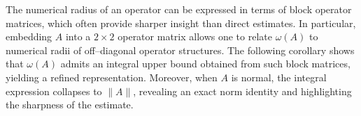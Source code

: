 \documentclass[12pt,twoside,reqno]{amsart}
\numberwithin{equation}{section}
\begin{document}
The numerical radius of an operator can be expressed in terms of block operator matrices, which often provide sharper insight than direct estimates. In particular, embedding $A$ into a $2\times2$ operator matrix allows one to relate $\omega(A)$ to numerical radii of off–diagonal operator structures. The following corollary shows that $\omega(A)$ admits an integral upper bound obtained from such block matrices, yielding a refined representation. Moreover, when $A$ is normal, the integral expression collapses to $\|A\|$, revealing an exact norm identity and highlighting the sharpness of the estimate.
\end{document}
